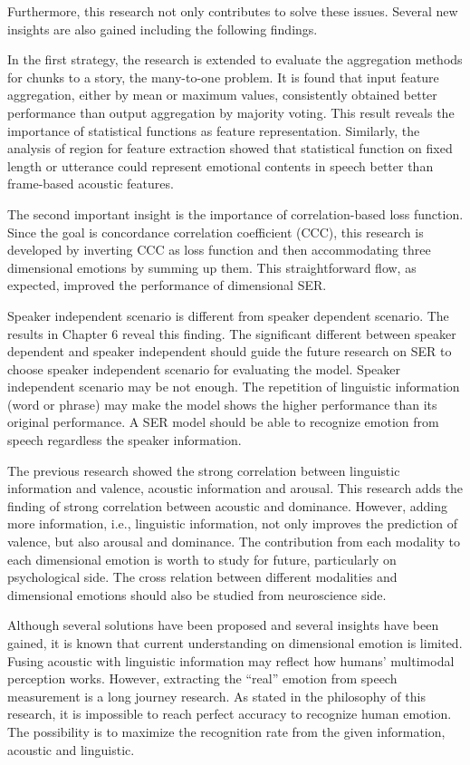 Furthermore, this research not only contributes to solve these issues. Several
new insights are also gained including the following findings.

In the first strategy, the research is extended to evaluate the aggregation
methods for chunks to a story, the many-to-one problem. It is found that input
feature aggregation, either by mean or maximum values, consistently obtained
better performance than output aggregation by majority voting. This result
reveals the importance of statistical functions as feature representation.
Similarly, the analysis of region for feature extraction showed that
statistical function on fixed length or utterance could represent emotional
contents in speech better than frame-based acoustic features.

The second important insight is the importance of correlation-based loss
function. Since the goal is concordance correlation coefficient (CCC), this
research is developed by inverting CCC as loss function and then accommodating
three dimensional emotions by summing up them. This straightforward flow, as
expected, improved the performance of dimensional SER.

Speaker independent scenario is different from speaker dependent scenario. The
results in Chapter 6 reveal this finding. The significant different between
speaker dependent and speaker independent should guide the future research on
SER to choose speaker independent scenario for evaluating the model. Speaker
independent scenario may be not enough. The repetition of linguistic information
(word or phrase) may make the model shows the higher performance than its
original performance. A SER model should be able to recognize emotion from
speech regardless the speaker information.

The previous research showed the strong correlation between linguistic
information and valence, acoustic information and arousal. This research adds
the finding of strong correlation between acoustic and dominance. However,
adding more information, i.e., linguistic information, not only improves the
prediction of valence, but also arousal and dominance. The contribution from
each modality to each dimensional emotion is worth to study for future,
particularly on psychological side. The cross relation between different
modalities and dimensional emotions should also be studied from neuroscience
side.

Although several solutions have been proposed and several insights have been
gained, it is known that current understanding on dimensional emotion is
limited. Fusing acoustic with linguistic information may reflect how humans'
multimodal perception works. However, extracting the ``real'' emotion from
speech measurement is a long journey research. As stated in the philosophy of
this research, it is impossible to reach perfect accuracy to recognize human
emotion. The possibility is to maximize the recognition rate from the given
information, acoustic and linguistic.


